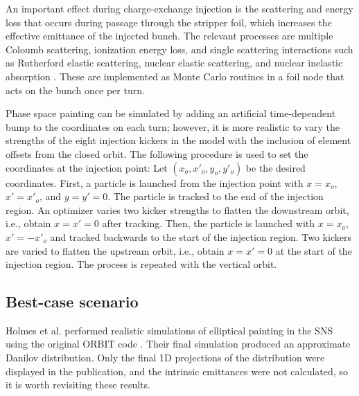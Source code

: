 An important effect during charge-exchange injection is the scattering and energy loss that occurs during passage through the stripper foil, which increases the effective emittance of the injected bunch. The relevant processes are multiple Coloumb scattering, ionization energy loss, and single scattering interactions such as Rutherford elastic scattering, nuclear elastic scattering, and nuclear inelastic absorption \cite{Chao2012, Cousineau2003}. These are implemented as Monte Carlo routines in a foil node that acts on the bunch once per turn.

Phase space painting can be simulated by adding an artificial time-dependent bump to the coordinates on each turn; however, it is more realistic to vary the strengths of the eight injection kickers in the model with the inclusion of element offsets from the closed orbit. The following procedure is used to set the coordinates at the injection point: Let $(x_o, x'_o, y_o, y'_o)$ be the desired coordinates. First, a particle is launched from the injection point with $x = x_o$, $x' = x'_o$, and $y = y' = 0$. The particle is tracked to the end of the injection region. An optimizer varies two kicker strengths to flatten the downstream orbit, i.e., obtain $x = x' = 0$ after tracking. Then, the particle is launched with $x = x_o$, $x' = -x'_o$ and tracked backwards to the start of the injection region. Two kickers are varied to flatten the upstream orbit, i.e., obtain $x = x' = 0$ at the start of the injection region. The process is repeated with the vertical orbit.


\subsection{Best-case scenario}

Holmes et al. performed realistic simulations of elliptical painting in the SNS using the original ORBIT code \cite{Holmes2018}. Their final simulation produced an approximate Danilov distribution. Only the final 1D projections of the distribution were displayed in the publication, and the intrinsic emittances were not calculated, so it is worth revisiting these results.

